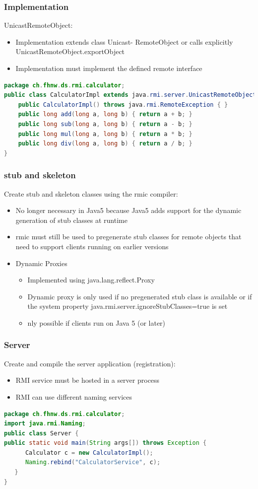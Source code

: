 \documentclass[10pt]{article}
\begin{document}
\subsubsection{Implementation}
UnicastRemoteObject:
\begin{itemize}
	\item Implementation extends class Unicast- RemoteObject or calls explicitly UnicastRemoteObject.exportObject
	\item Implementation must implement the defined remote interface
\end{itemize}
\begin{lstlisting}[language=Java, caption=Implementation, style=JavaStyle]
package ch.fhnw.ds.rmi.calculator;
public class CalculatorImpl extends java.rmi.server.UnicastRemoteObject implements Calculator {
	public CalculatorImpl() throws java.rmi.RemoteException { }
	public long add(long a, long b) { return a + b; } 
	public long sub(long a, long b) { return a - b; } 
	public long mul(long a, long b) { return a * b; } 
	public long div(long a, long b) { return a / b; }
}
\end{lstlisting}
\subsubsection{stub and skeleton}
Create stub and skeleton classes using the rmic compiler:
\begin{itemize}
	\item No longer necessary in Java5 because Java5 adds support for the dynamic generation of stub classes at runtime
	\item rmic must still be used to pregenerate stub classes for remote objects that need to support clients running on earlier versions
	\item Dynamic Proxies
		\begin{itemize}
			\item Implemented using java.lang.reflect.Proxy
			\item Dynamic proxy is only used if no pregenerated stub class is available or if the system property java.rmi.server.ignoreStubClasses=true is set
			\item nly possible if clients run on Java 5 (or later)
		\end{itemize}
\end{itemize}
\subsubsection{Server}
Create and compile the server application (registration):
\begin{itemize}
	\item RMI service must be hosted in a server process
	\item RMI can use different naming services
\end{itemize}
\begin{lstlisting}[language=Java, caption=Server, style=JavaStyle]
package ch.fhnw.ds.rmi.calculator;
import java.rmi.Naming;
public class Server {
public static void main(String args[]) throws Exception {
      Calculator c = new CalculatorImpl();
      Naming.rebind("CalculatorService", c);
   }
}
\end{lstlisting}
\end{document}
